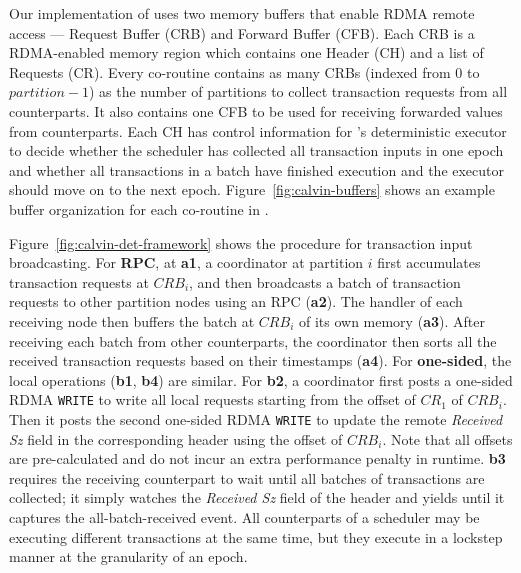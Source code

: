 Our implementation of \calvin uses two memory buffers that enable RDMA remote access ---
 \calvin Request Buffer (CRB) and \calvin Forward Buffer (CFB). Each CRB is a RDMA-enabled memory region which contains one \calvin Header (CH) and a list of \calvin Requests (CR). Every co-routine contains as many CRBs (indexed from $0$ to $partition-1$) as the number of partitions to collect transaction requests from all counterparts. It also contains one CFB to be used for receiving forwarded values from counterparts. Each CH has control information for \calvin's deterministic executor to decide whether the scheduler has collected all transaction inputs in one epoch and whether all transactions in a batch have finished execution and the executor should move on to the next epoch. Figure~\ref{fig:calvin-buffers} shows an example buffer organization for each co-routine in \calvin.

Figure~\ref{fig:calvin-det-framework} shows the procedure for transaction input broadcasting. For {\bf RPC}, at \step \textbf{a1},  a coordinator at partition $i$ first accumulates transaction requests at $CRB_{i}$, and then broadcasts a batch of transaction requests to other partition nodes using an RPC (\step \textbf{a2}). The handler of each receiving node then buffers the batch at $CRB_{i}$ of its own memory (\step \textbf{a3}). After receiving each batch from other counterparts, the coordinator then sorts all the received transaction requests based on their timestamps (\textbf{a4}). 
For {\bf one-sided}, the local operations (\step \textbf{b1}, \step \textbf{b4}) are similar. For \step \textbf{b2}, a coordinator first posts a one-sided RDMA \texttt{WRITE} to write all local \calvin requests starting from the offset of $CR_1$ of $CRB_{i}$. Then it posts the second one-sided RDMA \texttt{WRITE} to update the remote \textit{Received Sz} field in the corresponding \calvin header using the offset of $CRB_{i}$. Note that all offsets are pre-calculated and do not incur an extra performance penalty in runtime. \step \textbf{b3} requires the receiving counterpart to wait until all batches of transactions are collected; it simply watches the \textit{Received Sz} field of the \calvin header and yields until it captures the all-batch-received event. All counterparts of a scheduler may be executing different transactions at the same time, but they execute in a lockstep manner at the granularity of an epoch.

